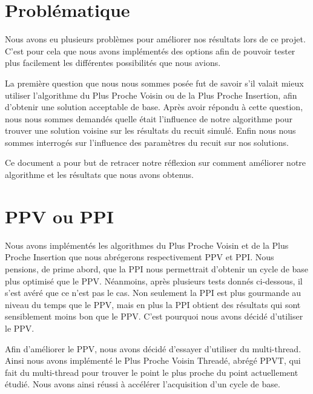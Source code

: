 \documentclass{article}
\begin{document}



\section{Problématique}

Nous avons eu plusieurs problèmes pour améliorer nos résultats lors de ce projet.
C'est pour cela que nous avons implémentés des options afin de pouvoir tester plus facilement les différentes possibilités que nous avions.
\par
La première question que nous nous sommes posée fut de savoir s'il valait mieux utiliser l'algorithme du Plus Proche Voisin ou de la Plus Proche Insertion, afin d'obtenir une solution acceptable de base.
Après avoir répondu à cette question, nous nous sommes demandés quelle était l'influence de notre algorithme pour trouver une solution voisine sur les résultats du recuit simulé.
Enfin nous nous sommes interrogés sur l'influence des paramètres du recuit sur nos solutions.
 
Ce document a pour but de retracer notre réflexion sur comment améliorer notre algorithme et les résultats que nous avons obtenus.
 
\section{PPV ou PPI}
 
Nous avons implémentés les algorithmes du Plus Proche Voisin et de la Plus Proche Insertion que nous abrégerons respectivement PPV et PPI.
Nous pensions, de prime abord, que la PPI nous permettrait d'obtenir un cycle de base plus optimisé que le PPV.
Néanmoins, après plusieurs tests donnés ci-dessous, il s'est avéré que ce n'est pas le cas.
Non seulement la PPI est plus gourmande au niveau du temps que le PPV, mais en plus la PPI obtient des résultats qui sont sensiblement moins bon que le PPV.
C'est pourquoi nous avons décidé d'utiliser le PPV.
\par
Afin d'améliorer le PPV, nous avons décidé d'essayer d'utiliser du multi-thread.
Ainsi nous avons implémenté le Plus Proche Voisin Threadé, abrégé PPVT, qui fait du multi-thread pour trouver le point le plus proche du point actuellement étudié.
Nous avons ainsi réussi à accélérer l'acquisition d'un cycle de base.
 
\end{document}
